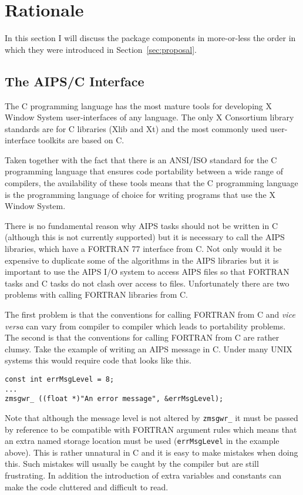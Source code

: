\section{Rationale}
\label{sec:rationale}

In this section I will discuss the package components in more-or-less
the order in which they were introduced in Section~\ref{sec:proposal}.

\subsection{The AIPS/C Interface}

The C programming language has the most mature tools for developing
X Window System user-interfaces of any language.  The only X
Consortium library standards are for C libraries (Xlib and Xt) and the
most commonly used user-interface toolkits are based on C.

Taken together with the fact that there is an ANSI/ISO standard for
the C programming language that ensures code portability between a
wide range of compilers, the availability of these tools means that
the C programming language is the programming language of choice for
writing programs that use the X Window System.

There is no fundamental reason why AIPS tasks should not be written in
C (although this is not currently supported) but it is necessary to
call the AIPS libraries, which have a FORTRAN 77 interface from C.
Not only would it be expensive to duplicate some of the algorithms in
the AIPS libraries but it is important to use the AIPS I/O system to
access AIPS files so that FORTRAN tasks and C tasks do not clash over
access to files.  Unfortunately there are two problems with calling
FORTRAN libraries from C.

The first problem is that the conventions for calling FORTRAN from C
and {\em vice versa} can vary from compiler to compiler which leads to
portability problems.  The second is that the conventions for calling
FORTRAN from C are rather clumsy.  Take the example of writing an AIPS
message in C.  Under many UNIX systems this would require code that
looks like this.
\begin{verbatim}
const int errMsgLevel = 8;
...
zmsgwr_ ((float *)"An error message", &errMsgLevel);
\end{verbatim}
Note that although the message level is not altered by {\tt zmsgwr\_}
it must be passed by reference to be compatible with FORTRAN argument
rules which means that an extra named storage location must be used
({\tt errMsgLevel} in the example above).  This is rather unnatural in
C and it is easy to make mistakes when doing this.  Such mistakes will
usually be caught by the compiler but are still frustrating.  In
addition the introduction of extra variables and constants can make
the code cluttered and difficult to read.

